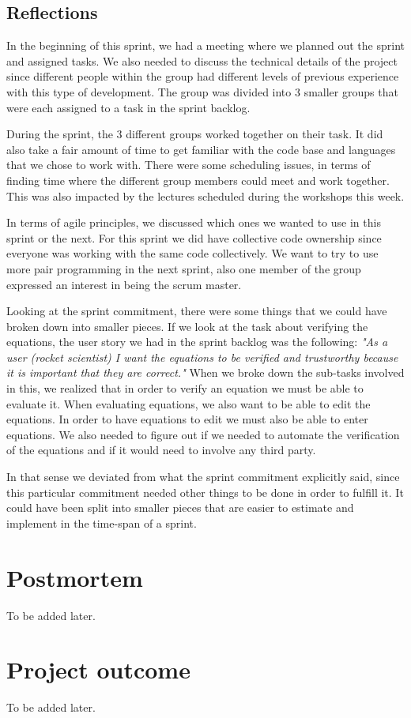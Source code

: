 \documentclass[14]{article}
\begin{document}
\subsection{Reflections}

In the beginning of this sprint, we had a meeting where we planned out the sprint and assigned tasks. We also needed to discuss the technical details of the project since different people within the group had different levels of previous experience with this type of development. The group was divided into 3 smaller groups that were each assigned to a task in the sprint backlog.

During the sprint,  the 3 different groups worked together on their task. It did also take a fair amount of time to get familiar with the code base and languages that we chose to work with. There were some scheduling issues, in terms of finding time where the different group members could meet and work together. This was also impacted by the lectures scheduled during the workshops this week.

In terms of agile principles, we discussed which ones we wanted to use in this sprint or the next. For this sprint we did have collective code ownership since everyone was working with the same code collectively. We want to try to use more pair programming in the next sprint, also one member of the group expressed an interest in being the scrum master. 

Looking at the sprint commitment, there were some things that we could have broken down into smaller pieces. If we look at the task about verifying the equations, the user story we had in the sprint backlog was the following: \textit{"As a user (rocket scientist) I want the equations to be verified and trustworthy because it is important that they are correct."} When we broke down the sub-tasks involved in this, we realized that in order to verify an equation we must be able to evaluate it. When evaluating equations, we also want to be able to edit the equations. In order to have equations to edit we must also be able to enter equations. We also needed to figure out if we needed to automate the verification of the equations and if it would need to involve any third party. 

In that sense we deviated from what the sprint commitment explicitly said, since this particular commitment needed other things to be done in order to fulfill it. It could have been split into smaller pieces that are easier to estimate and implement in the time-span of a sprint.




\section{Postmortem}
To be added later.

\section{Project outcome}
To be added later.
\end{document}
